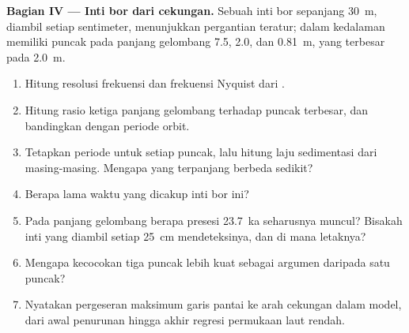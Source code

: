 \begin{problem}
\medskip\noindent\textbf{Bagian IV --- Inti bor dari cekungan.} Sebuah inti bor
  sepanjang \qty{30}{m}, diambil setiap sentimeter, menunjukkan pergantian teratur; 
  dalam kedalaman memiliki puncak pada panjang gelombang 7.5, 2.0, dan \qty{0.81}{m},
  yang terbesar pada \qty{2.0}{m}.
\begin{enumerate}[resume]
\item Hitung resolusi frekuensi dan frekuensi Nyquist dari
  .
\item Hitung rasio ketiga panjang gelombang terhadap puncak terbesar, dan
  bandingkan dengan periode orbit.
\item Tetapkan periode untuk setiap puncak, lalu hitung laju sedimentasi dari
  masing-masing. Mengapa yang terpanjang berbeda sedikit?
\item Berapa lama waktu yang dicakup inti bor ini?
\item Pada panjang gelombang berapa presesi \qty{23.7}{ka} seharusnya muncul?
  Bisakah inti yang diambil setiap \qty{25}{cm} mendeteksinya, dan di mana letaknya?
\item Mengapa kecocokan tiga puncak lebih kuat sebagai argumen daripada satu puncak?
\item Nyatakan pergeseran maksimum garis pantai ke arah cekungan dalam model, dari
  awal penurunan hingga akhir regresi permukaan laut rendah.
\end{enumerate}
\end{problem}
